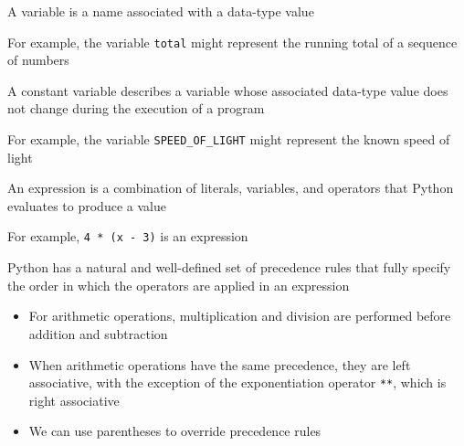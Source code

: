 \documentclass[8pt,a4paper,compress]{beamer}
\begin{document}
\begin{frame}[fragile]
\pause

A variable is a name associated with a data-type value

\pause
\bigskip

For example, the variable \lstinline{total} might represent the running total of a sequence of numbers

\pause
\bigskip

A constant variable describes a variable whose associated data-type value does not change during the execution of a program

\pause
\bigskip

For example, the variable \lstinline{SPEED_OF_LIGHT} might represent the known speed of light

\pause
\bigskip

An expression is a combination of literals, variables, and operators that Python evaluates to produce a value

\pause
\bigskip

For example, \lstinline{4 * (x - 3)} is an expression

\pause
\bigskip

Python has a natural and well-defined set of precedence rules that fully specify the order in which the operators are applied in an expression
\begin{itemize}
\item For arithmetic operations, multiplication and division are performed before addition and subtraction

\item When arithmetic operations have the same precedence, they are left associative, with the exception of the exponentiation operator \lstinline{**}, which is right associative

\item We can use parentheses to override precedence rules
\end{itemize} 
\end{frame}
\end{document}

